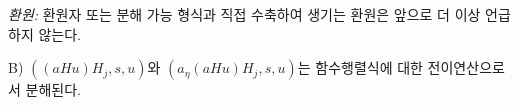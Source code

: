 
\noindent\emph{환원:} 환원자 또는 분해 가능 형식과 직접 수축하여 생기는 환원은 앞으로 더 이상 언급하지 않는다.

B) $((aHu)H_j,s,u)$와 $(a_\eta(aHu)H_j,s,u)$는 함수행렬식에 대한 전이연산으로서 분해된다.
